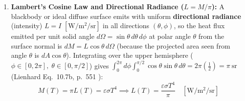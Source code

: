 \begin{enumerate}
\begin{itemize}
  \end{itemize}
  \emph{Caution on Frequency Peak $\nu_{\max}$:} Because $M_\nu = M_\lambda |d\lambda/d\nu| = (\lambda^2/c_0)M_\lambda$, the peak of Planck's distribution per unit frequency $M_{\nu,b}(\nu,T)$ occurs at $x_\nu = h\nu_{\max}/(k_B T) = 2.821439$, so $\nu_{\max}/T = \SI{5.8789e10}{\hertz\per\kelvin}$ and $\lambda_{\max}\nu_{\max} = \frac{2.8214}{4.9651}c_0 = 0.56825\,c_0 \ne c_0$!
  \item \textbf{Lambert's Cosine Law and Directional Radiance ($L = M/\pi$):} A blackbody or ideal diffuse surface emits with uniform \textbf{directional radiance} (intensity) $L = I$ $[\si{\watt\per\square\meter\per\steradian}]$ in all directions $(\theta, \phi)$, so the heat flux emitted per unit solid angle $d\Omega = \sin\theta\,d\theta\,d\phi$ at polar angle $\theta$ from the surface normal is $dM = L \cos\theta\,d\Omega$ (because the projected area seen from angle $\theta$ is $dA\cos\theta$). Integrating over the upper hemisphere ($\phi \in [0, 2\pi],\; \theta \in [0, \pi/2]$) gives $\int_0^{2\pi}d\phi \int_0^{\pi/2}\cos\theta\sin\theta\,d\theta = 2\pi\left(\frac{1}{2}\right) = \pi\ \si{\steradian}$ (Lienhard Eq.~10.7b, p.~551 ):
  \begin{equation}
    M(T) = \pi L(T) = \varepsilon \sigma T^4 \implies L(T) = \frac{\varepsilon \sigma T^4}{\pi} \quad \left[\si{\watt\per\square\meter\per\steradian}\right]
    \label{eq:12:lambert-radiance}
  \end{equation}
\end{enumerate}

